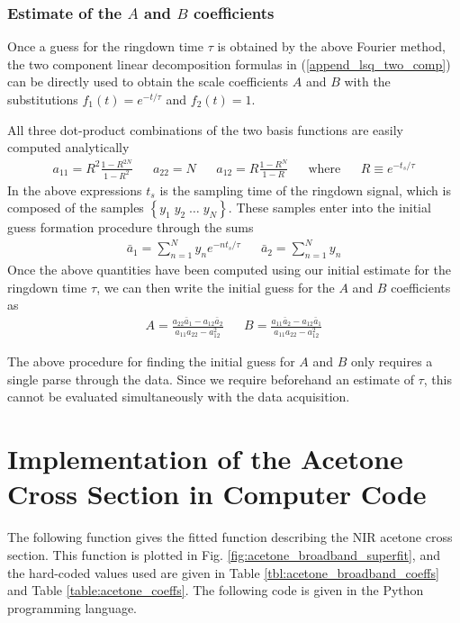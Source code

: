\subsubsection{Estimate of the $A$ and $B$ coefficients}
Once a guess for the ringdown time $\tau$ is obtained by the above Fourier method, the two component linear decomposition formulas in (\ref{append_lsq_two_comp}) can be directly used to obtain the scale coefficients $A$ and $B$ with the substitutions $f_1(t) = e^{-t/\tau}$ and $f_2(t) = 1$.

All three dot-product combinations of the two basis functions are easily computed analytically
\begin{align}
	a_{11} = R^2 \frac{1 - R^{2N}}{1-R^2} && a_{22} = N && a_{12} = R \frac{1 - R^N}{1 - R} &&\text{where}&& R \equiv e^{-t_s/\tau}
\end{align}
In the above expressions $t_s$ is the sampling time of the ringdown signal, which is composed of the samples $\left\{y_1\; y_2\;\ldots\; y_N\right\}$. These samples enter into the initial guess formation procedure through the sums
\begin{align}
	\bar{a}_1 = \sum_{n=1}^{N} y_n e^{-nt_s/\tau} && \bar{a}_2 = \sum_{n=1}^{N} y_n
\end{align}
Once the above quantities have been computed using our initial estimate for the ringdown time $\tau$, we can then write the initial guess for the $A$ and $B$ coefficients as
\begin{align}
	A = \frac{a_{22} \bar{a}_1 - a_{12}\bar{a}_2}{a_{11}a_{22} - a_{12}^2}
	&&
	B = \frac{a_{11} \bar{a}_2 - a_{12}\bar{a}_1}{a_{11}a_{22} - a_{12}^2}
\end{align}

The above procedure for finding the initial guess for $A$ and $B$ only requires a single parse through the data. Since we require beforehand an estimate of $\tau$, this cannot be evaluated simultaneously with the data acquisition.


\section{Implementation of the Acetone Cross Section in Computer Code} \label{sec:subsys_acetone_function}
The following function gives the fitted function describing the NIR acetone cross section. This function is plotted in Fig. \ref{fig:acetone_broadband_superfit}, and the hard-coded values used are given in Table \ref{tbl:acetone_broadband_coeffs} and Table \ref{table:acetone_coeffs}. The following code is given in the Python programming language.

